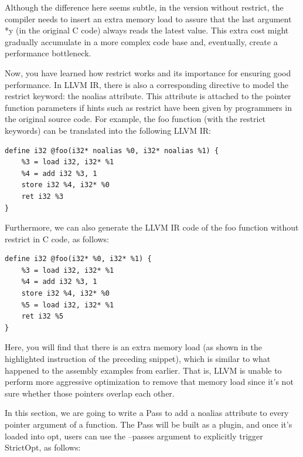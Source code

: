 Although the difference here seems subtle, in the version without restrict, the compiler needs to insert an extra memory load to assure that the last argument *y (in the original C code) always reads the latest value. This extra cost might gradually accumulate in a more complex code base and, eventually, create a performance bottleneck.

Now, you have learned how restrict works and its importance for ensuring good
performance. In LLVM IR, there is also a corresponding directive to model the restrict keyword: the noalias attribute. This attribute is attached to the  pointer function parameters if hints such as restrict have been given by programmers in  the original source code. For example, the foo function (with the restrict keywords) can be translated into the following LLVM IR:

\begin{lstlisting}[style=stylePython]
define i32 @foo(i32* noalias %0, i32* noalias %1) {
	%3 = load i32, i32* %1
	%4 = add i32 %3, 1
	store i32 %4, i32* %0
	ret i32 %3
}
\end{lstlisting}

Furthermore, we can also generate the LLVM IR code of the foo function without restrict in C code, as follows:

\begin{lstlisting}[style=stylePython]
define i32 @foo(i32* %0, i32* %1) {
	%3 = load i32, i32* %1
	%4 = add i32 %3, 1
	store i32 %4, i32* %0
	%5 = load i32, i32* %1
	ret i32 %5
}
\end{lstlisting}

Here, you will find that there is an extra memory load (as shown in the highlighted instruction of the preceding snippet), which is similar to what happened to the assembly examples from earlier. That is, LLVM is unable to perform more aggressive optimization to remove that memory load since it's not sure whether those pointers overlap each other.

In this section, we are going to write a Pass to add a noalias attribute to every pointer argument of a function. The Pass will be built as a plugin, and once it's loaded into opt, users can use the --passes argument to explicitly trigger StrictOpt, as follows:


